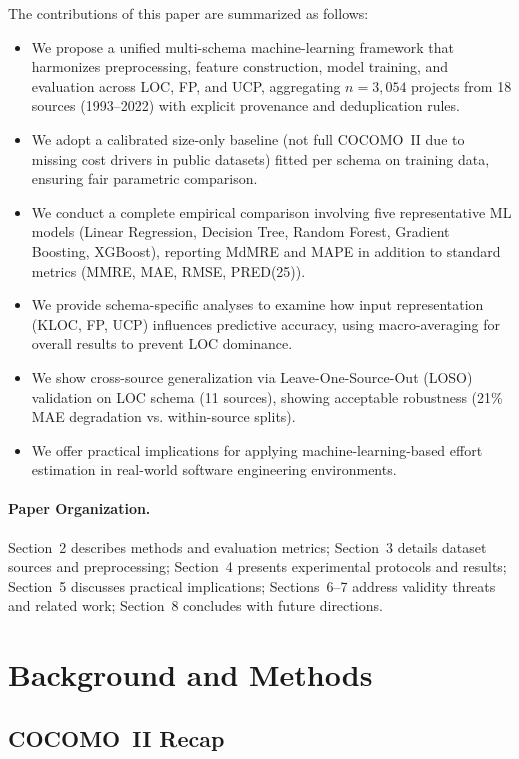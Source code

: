 \documentclass[11pt,a4paper]{article}
\begin{document}
The contributions of this paper are summarized as follows:
\begin{itemize}
    \item We propose a unified multi-schema machine-learning framework that harmonizes preprocessing, feature construction, model training, and evaluation across LOC, FP, and UCP, aggregating $n=3{,}054$ projects from 18 sources (1993--2022) with explicit provenance and deduplication rules.
    \item We adopt a calibrated size-only baseline (not full COCOMO~II due to missing cost drivers in public datasets) fitted per schema on training data, ensuring fair parametric comparison.
    \item We conduct a complete empirical comparison involving five representative ML models (Linear Regression, Decision Tree, Random Forest, Gradient Boosting, XGBoost), reporting MdMRE and MAPE in addition to standard metrics (MMRE, MAE, RMSE, PRED(25)).
    \item We provide schema-specific analyses to examine how input representation (KLOC, FP, UCP) influences predictive accuracy, using macro-averaging for overall results to prevent LOC dominance.
    \item We show cross-source generalization via Leave-One-Source-Out (LOSO) validation on LOC schema (11 sources), showing acceptable robustness (21\% MAE degradation vs. within-source splits).
    \item We offer practical implications for applying machine-learning-based effort estimation in real-world software engineering environments.
\end{itemize}

\paragraph{Paper Organization.}
Section~2 describes methods and evaluation metrics; Section~3 details dataset sources and preprocessing; Section~4 presents experimental protocols and results; Section~5 discusses practical implications; Sections~6--7 address validity threats and related work; Section~8 concludes with future directions.

\section{Background and Methods}
\subsection{COCOMO~II Recap}
\end{document}
